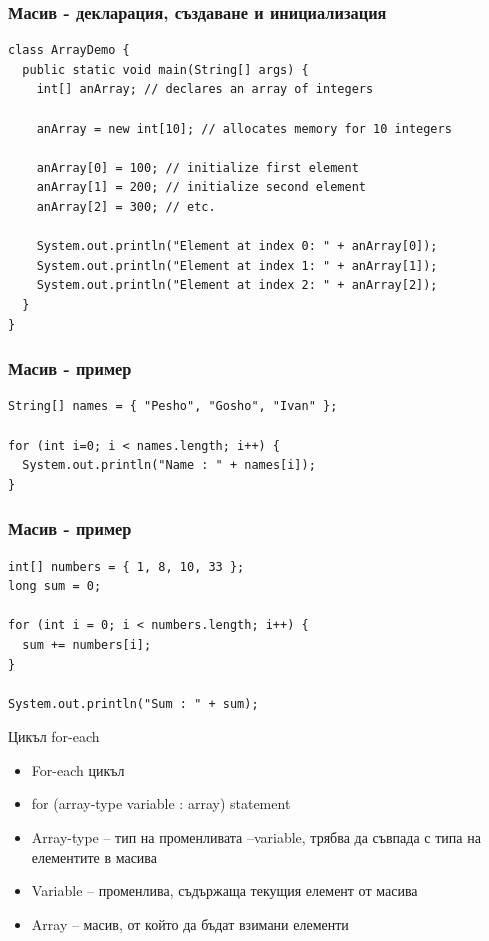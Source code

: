 \documentclass{beamer}
\begin{document}
\begin{frame}[fragile]
  \frametitle{Масив - декларация, създаване и инициализация}
  \transdissolve
\begin{lstlisting}[basicstyle=\tiny]
class ArrayDemo {
  public static void main(String[] args) {
    int[] anArray; // declares an array of integers             

    anArray = new int[10]; // allocates memory for 10 integers
           
    anArray[0] = 100; // initialize first element
    anArray[1] = 200; // initialize second element
    anArray[2] = 300; // etc.

    System.out.println("Element at index 0: " + anArray[0]);
    System.out.println("Element at index 1: " + anArray[1]);
    System.out.println("Element at index 2: " + anArray[2]);
  }
} 
\end{lstlisting}
\end{frame}

\begin{frame}[fragile]
  \frametitle{Масив - пример}
  \transdissolve
\begin{lstlisting}
String[] names = { "Pesho", "Gosho", "Ivan" };

for (int i=0; i < names.length; i++) {
  System.out.println("Name : " + names[i]);
}
\end{lstlisting}
\end{frame}

\begin{frame}[fragile]
  \frametitle{Масив - пример}
  \transdissolve
\begin{lstlisting}
int[] numbers = { 1, 8, 10, 33 };
long sum = 0;

for (int i = 0; i < numbers.length; i++) {
  sum += numbers[i];
}

System.out.println("Sum : " + sum);
\end{lstlisting}
\end{frame}

\begin{frame}{Цикъл for-each}
  \transdissolve
  \begin{itemize}
  \item For-each цикъл
    \item for (array-type variable : array) statement

    \item Array-type – тип на променливата
    –variable, трябва да съвпада с типа на
    елементите в масива
    \item Variable – променлива, съдържаща
    текущия елемент от масива
    \item Array – масив, от който да бъдат
    взимани елементи

  \end{itemize}
\end{frame}
\end{document}
